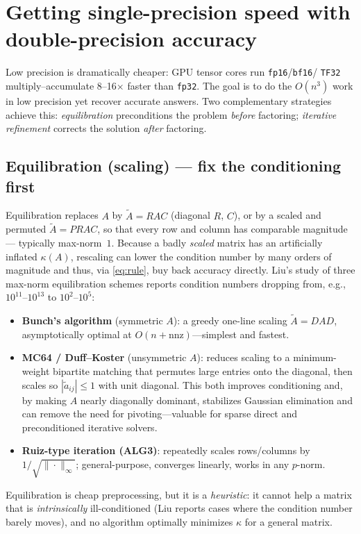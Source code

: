 \documentclass[11pt]{article}
\begin{document}
\section{Getting single-precision speed with double-precision accuracy}

Low precision is dramatically cheaper: GPU tensor cores run \texttt{fp16}/\texttt{bf16}/%
\texttt{TF32} multiply--accumulate 8--16$\times$ faster than \texttt{fp32}. The goal is to do
the $O(n^3)$ work in low precision yet recover accurate answers. Two complementary
strategies achieve this: \emph{equilibration} preconditions the problem \emph{before}
factoring; \emph{iterative refinement} corrects the solution \emph{after} factoring.

\subsection{Equilibration (scaling) --- fix the conditioning first}

Equilibration replaces $A$ by $\tilde A = RAC$ (diagonal $R$, $C$), or by a scaled and
permuted $\tilde A = PRAC$, so that every row and column has comparable magnitude---%
typically max-norm~$1$. Because a badly \emph{scaled} matrix has an artificially inflated
$\kappa(A)$, rescaling can lower the condition number by many orders of magnitude and thus,
via \eqref{eq:rule}, buy back accuracy directly. Liu's study of three max-norm
equilibration schemes reports condition numbers dropping from, e.g., $10^{11}$--$10^{13}$
to $10^{2}$--$10^{5}$:
\begin{itemize}\itemsep2pt
  \item \textbf{Bunch's algorithm} (symmetric $A$): a greedy one-line scaling
  $\tilde A=DAD$, asymptotically optimal at $O(n+\mathrm{nnz})$---simplest and fastest.
  \item \textbf{MC64 / Duff--Koster} (unsymmetric $A$): reduces scaling to a
  minimum-weight bipartite matching that permutes large entries onto the diagonal, then
  scales so $|\tilde a_{ij}|\le1$ with unit diagonal. This both improves conditioning and,
  by making $A$ nearly diagonally dominant, stabilizes Gaussian elimination and can remove
  the need for pivoting---valuable for sparse direct and preconditioned iterative solvers.
  \item \textbf{Ruiz-type iteration (ALG3)}: repeatedly scales rows/columns by
  $1/\sqrt{\|\cdot\|_\infty}$; general-purpose, converges linearly, works in any $p$-norm.
\end{itemize}
Equilibration is cheap preprocessing, but it is a \emph{heuristic}: it cannot help a matrix
that is \emph{intrinsically} ill-conditioned (Liu reports cases where the condition number
barely moves), and no algorithm optimally minimizes $\kappa$ for a general matrix.
\end{document}
